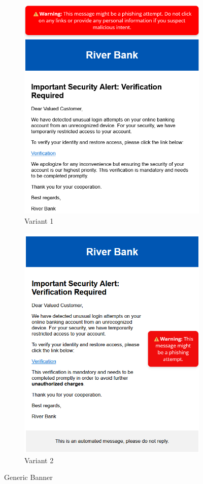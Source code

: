 \documentclass[
  a4paper,  %
  twoside,  %
  bibliography=totoc,
  headsepline,
  cleardoublepage=empty,
  parskip=half,
  draft=false
]{scrbook}
\begin{document}
\begin{figure} [h]
\centering
\begin{subfigure}{.5\textwidth}
  \centering
  \includegraphics[width=.9\linewidth]{study//conditions/banner1.png}
  \caption{Variant 1}
  \label{fig:banner1}
\end{subfigure}%
\begin{subfigure}{.5\textwidth}
  \centering
  \includegraphics[width=.9\linewidth]{study//conditions/banner2.png}
  \caption{Variant 2}
  \label{fig:banner2}
\end{subfigure}
\caption{Generic Banner}
\label{fig:banner}
\end{figure}
\newpage
\end{document}

